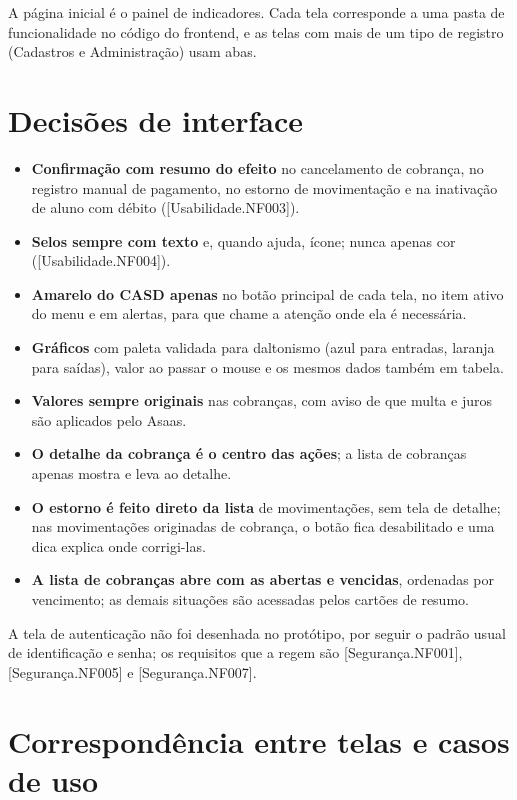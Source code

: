 \documentclass[11pt,a4paper,oneside]{report}
\begin{document}
A página inicial é o painel de indicadores. Cada tela corresponde a uma pasta de funcionalidade no
código do frontend, e as telas com mais de um tipo de registro (Cadastros e Administração) usam
abas.

\section{Decisões de interface}

\begin{itemize}
  \item \textbf{Confirmação com resumo do efeito} no cancelamento de cobrança, no registro manual
        de pagamento, no estorno de movimentação e na inativação de aluno com débito
        ([Usabilidade.NF003]).
  \item \textbf{Selos sempre com texto} e, quando ajuda, ícone; nunca apenas cor
        ([Usabilidade.NF004]).
  \item \textbf{Amarelo do CASD apenas} no botão principal de cada tela, no item ativo do menu e em
        alertas, para que chame a atenção onde ela é necessária.
  \item \textbf{Gráficos} com paleta validada para daltonismo (azul para entradas, laranja para
        saídas), valor ao passar o mouse e os mesmos dados também em tabela.
  \item \textbf{Valores sempre originais} nas cobranças, com aviso de que multa e juros são
        aplicados pelo Asaas.
  \item \textbf{O detalhe da cobrança é o centro das ações}; a lista de cobranças apenas mostra e
        leva ao detalhe.
  \item \textbf{O estorno é feito direto da lista} de movimentações, sem tela de detalhe; nas
        movimentações originadas de cobrança, o botão fica desabilitado e uma dica explica onde
        corrigi-las.
  \item \textbf{A lista de cobranças abre com as abertas e vencidas}, ordenadas por vencimento; as
        demais situações são acessadas pelos cartões de resumo.
\end{itemize}

A tela de autenticação não foi desenhada no protótipo, por seguir o padrão usual de identificação
e senha; os requisitos que a regem são [Segurança.NF001], [Segurança.NF005] e [Segurança.NF007].

\section{Correspondência entre telas e casos de uso}
\end{document}
